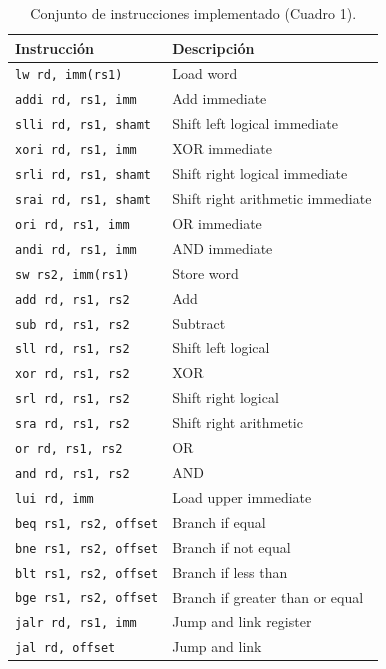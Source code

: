 \documentclass[11pt,a4paper]{article}
\begin{document}
\begin{table}[ht]
	\centering
	\begin{tabular}{|l|l|}
		\hline
		\textbf{Instrucción}          & \textbf{Descripción}             \\
		\hline
		\texttt{lw rd, imm(rs1)}      & Load word                        \\ \hline
		\texttt{addi rd, rs1, imm}    & Add immediate                    \\ \hline
		\texttt{slli rd, rs1, shamt}  & Shift left logical immediate     \\ \hline
		\texttt{xori rd, rs1, imm}    & XOR immediate                    \\ \hline
		\texttt{srli rd, rs1, shamt}  & Shift right logical immediate    \\ \hline
		\texttt{srai rd, rs1, shamt}  & Shift right arithmetic immediate \\ \hline
		\texttt{ori rd, rs1, imm}     & OR immediate                     \\ \hline
		\texttt{andi rd, rs1, imm}    & AND immediate                    \\ \hline
		\texttt{sw rs2, imm(rs1)}     & Store word                       \\ \hline
		\texttt{add rd, rs1, rs2}     & Add                              \\ \hline
		\texttt{sub rd, rs1, rs2}     & Subtract                         \\ \hline
		\texttt{sll rd, rs1, rs2}     & Shift left logical               \\ \hline
		\texttt{xor rd, rs1, rs2}     & XOR                              \\ \hline
		\texttt{srl rd, rs1, rs2}     & Shift right logical              \\ \hline
		\texttt{sra rd, rs1, rs2}     & Shift right arithmetic           \\ \hline
		\texttt{or rd, rs1, rs2}      & OR                               \\ \hline
		\texttt{and rd, rs1, rs2}     & AND                              \\ \hline
		\texttt{lui rd, imm}          & Load upper immediate             \\ \hline
		\texttt{beq rs1, rs2, offset} & Branch if equal                  \\ \hline
		\texttt{bne rs1, rs2, offset} & Branch if not equal              \\ \hline
		\texttt{blt rs1, rs2, offset} & Branch if less than              \\ \hline
		\texttt{bge rs1, rs2, offset} & Branch if greater than or equal  \\ \hline
		\texttt{jalr rd, rs1, imm}    & Jump and link register           \\ \hline
		\texttt{jal rd, offset}       & Jump and link                    \\ \hline
	\end{tabular}
	\caption{Conjunto de instrucciones implementado (Cuadro 1).}
	\label{cuadro:isa}
\end{table}
\end{document}
